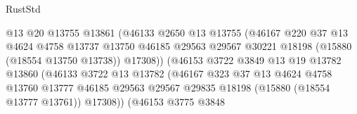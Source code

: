 \begin{lexlean}{RustStd}
\begin{coremodule}
                                        @13
                                        @20
                                        @13755
                                        @13861
                                        (@46133
                                          @2650
                                          @13
                                          @13755
                                          (@46167
                                            @220
                                            @37
                                            @13
                                            @4624
                                            @4758
                                            @13737
                                            @13750
                                            @46185
                                            @29563
                                            @29567
                                            @30221
                                            @18198
                                            (@15880 (@18554 @13750 @13738))
                                            @17308))
                                        (@46153
                                          @3722
                                          @3849
                                          @13
                                          @19
                                          @13782
                                          @13860
                                          (@46133
                                            @3722
                                            @13
                                            @13782
                                            (@46167
                                              @323
                                              @37
                                              @13
                                              @4624
                                              @4758
                                              @13760
                                              @13777
                                              @46185
                                              @29563
                                              @29567
                                              @29835
                                              @18198
                                              (@15880 (@18554 @13777 @13761))
                                              @17308))
                                          (@46153
                                            @3775
                                            @3848

\end{coremodule}
\end{lexlean}
